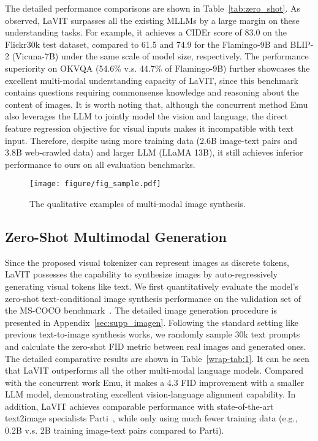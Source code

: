 The detailed performance comparisons are shown in Table~\ref{tab:zero_shot}. As observed, LaVIT surpasses all the existing MLLMs by a large margin on these understanding tasks. For example, it achieves a CIDEr score of 83.0 on the Flickr30k test dataset, compared to 61.5 and 74.9 for the Flamingo-9B and BLIP-2 (Vicuna-7B) under the same scale of model size, respectively. The performance superiority on OKVQA (54.6\% v.s. 44.7\% of Flamingo-9B) further showcases the excellent multi-modal understanding capacity of LaVIT, since this benchmark contains questions requiring commonsense knowledge and reasoning about the content of images. It is worth noting that, although the concurrent method Emu~\citep{sun2023generative} also leverages the LLM to jointly model the vision and language, the direct feature regression objective for visual inputs makes it incompatible with text input. Therefore, despite using more training data (2.6B image-text pairs and 3.8B web-crawled data) and larger LLM (LLaMA 13B), it still achieves inferior performance to ours on all evaluation benchmarks.

\begin{figure}[t]
\begin{center}
\texttt{[image: figure/fig\_sample.pdf]}
\vspace{-0.1in}
\end{center}
  \caption{The qualitative examples of multi-modal image synthesis.}
\label{fig:fig4}
\vspace{-0.25in}
\end{figure}

\subsection{Zero-Shot Multimodal Generation}
Since the proposed visual tokenizer can represent images as discrete tokens, LaVIT possesses the capability to synthesize images by auto-regressively generating visual tokens like text. We first quantitatively evaluate the model's zero-shot text-conditional image synthesis performance on the validation set of the MS-COCO benchmark~\citep{lin2014microsoft}. The detailed image generation procedure is presented in Appendix~\ref{sec:supp_imagen}. Following the standard setting like previous text-to-image synthesis works, we randomly sample 30k text prompts and calculate the zero-shot FID metric between real images and generated ones. The detailed comparative results are shown in Table~\ref{wrap-tab:1}. It can be seen that LaVIT outperforms all the other multi-modal language models. Compared with the concurrent work Emu, it makes a 4.3 FID improvement with a smaller LLM model, demonstrating excellent vision-language alignment capability. In addition, LaVIT achieves comparable performance with state-of-the-art text2image specialists Parti~\citep{yu2022scaling}, while only using much fewer training data (e.g., 0.2B v.s. 2B training image-text pairs compared to Parti). 

